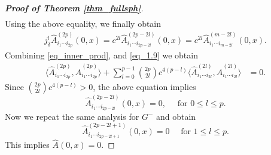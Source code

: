 \documentclass[11pt,a4paper,reqno]{amsart}
\begin{document}
\begin{proof}[\textbf{Proof of Theorem \ref{thm_fullsph}}]
\begin{align*}
		\end{align*}
		Using the above equality, we finally obtain
		\begin{align}\label{eq_1.9}
			j^{l}_{\delta} \hat{A}^{(2p)}_{i_1\cdots i_{2p}}(0,x) = {c^{2l}} \hat{A}^{(2p-2l)}_{i_1\cdots i_{2p-2l}}(0,x)={c^{2l}}  \hat{A}^{(m-2l)}_{i_1\cdots i_{m-2l}}(0,x).
		\end{align}
		Combining \eqref{eq_inner_prod}, and \eqref{eq_1.9} we obtain
		\begin{equation}\label{step_2}
			\begin{aligned}
				\langle \hat{A}_{i_1\cdots i_{2p}}^{(2p)} , \hat{A}_{i_1\cdots i_{2p}}^{(2p)} \rangle +    \sum\limits_{l=0}^{p-1}
				\binom{2p}{2l}c^{4(p-l)}\langle \hat{A}_{i_1\cdots i_{2l}}^{(2l)} ,\hat{A}_{i_1\cdots i_{2l}}^{(2l)} \rangle&=0.
			\end{aligned}
		\end{equation}
		Since $\binom{2p}{2l}c^{4(p-l)} >0$, the above equation implies \[ \hat{A}^{(2p-2l)}_{i_1\cdots i_{2p-2l}}(0,x)=0,\quad \text{ for } 0\le l \le p.\] Now we repeat the same analysis for $G^-$ and obtain \[ \hat{A}^{(2p-2l+1)}_{i_1\cdots i_{2p-2l+1}}(0,x)=0 \quad \text{ for } 1\le l \le p.\] This implies $ \hat{A}(0,x)=0$. 
		

\end{proof}
\end{document}

